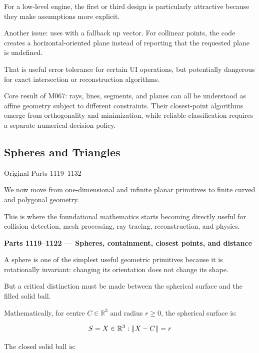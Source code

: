 For a low-level engine, the first or third design is particularly attractive because they make assumptions more explicit.

Another issue:  uses  with a fallback up vector. For collinear points, the code creates a horizontal-oriented plane instead of reporting that the requested plane is undefined.

That is useful error tolerance for certain UI operations, but potentially dangerous for exact intersection or reconstruction algorithms.

Core result of M067: rays, lines, segments, and planes can all be understood as affine geometry subject to different constraints. Their closest-point algorithms emerge from orthogonality and minimization, while reliable classification requires a separate numerical decision policy.

\subsection{Spheres and Triangles}\label{03-visual-computing-i-ch020-spheres-and-triangles}

\hypertarget{03-visual-computing-i-ch020-spheres-and-triangles}{}

Original Parts 1119--1132

We now move from one-dimensional and infinite planar primitives to finite curved and polygonal geometry.

This is where the foundational mathematics starts becoming directly useful for collision detection, mesh processing, ray tracing, reconstruction, and physics.

\textbf{Parts 1119--1122 --- Spheres, containment, closest points, and distance}

A sphere is one of the simplest useful geometric primitives because it is rotationally invariant: changing its orientation does not change its shape.

But a critical distinction must be made between the spherical surface and the filled solid ball.

Mathematically, for centre \(C\in\mathbb R^3\) and radius \(r\ge0\), the spherical surface is:

\[
S=\\{X\in\mathbb R^3:\|X-C\|=r\\}
\]

The closed solid ball is:

